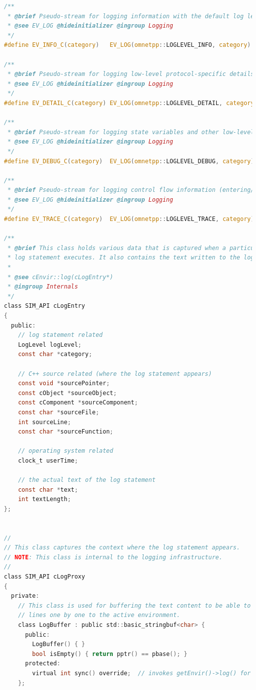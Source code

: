 \begin{lstlisting}[language=c]
/**
 * @brief Pseudo-stream for logging information with the default log level of a specific category. See EV_LOG for details.
 * @see EV_LOG @hideinitializer @ingroup Logging
 */
#define EV_INFO_C(category)   EV_LOG(omnetpp::LOGLEVEL_INFO, category)

/**
 * @brief Pseudo-stream for logging low-level protocol-specific details of a specific category. See EV_LOG for details.
 * @see EV_LOG @hideinitializer @ingroup Logging
 */
#define EV_DETAIL_C(category) EV_LOG(omnetpp::LOGLEVEL_DETAIL, category)

/**
 * @brief Pseudo-stream for logging state variables and other low-level information of a specific category. See EV_LOG for details.
 * @see EV_LOG @hideinitializer @ingroup Logging
 */
#define EV_DEBUG_C(category)  EV_LOG(omnetpp::LOGLEVEL_DEBUG, category)

/**
 * @brief Pseudo-stream for logging control flow information (entering/exiting functions, etc) of a specific category. See EV_LOG for details.
 * @see EV_LOG @hideinitializer @ingroup Logging
 */
#define EV_TRACE_C(category)  EV_LOG(omnetpp::LOGLEVEL_TRACE, category)

/**
 * @brief This class holds various data that is captured when a particular
 * log statement executes. It also contains the text written to the log stream.
 *
 * @see cEnvir::log(cLogEntry*)
 * @ingroup Internals
 */
class SIM_API cLogEntry
{
  public:
    // log statement related
    LogLevel logLevel;
    const char *category;

    // C++ source related (where the log statement appears)
    const void *sourcePointer;
    const cObject *sourceObject;
    const cComponent *sourceComponent;
    const char *sourceFile;
    int sourceLine;
    const char *sourceFunction;

    // operating system related
    clock_t userTime;

    // the actual text of the log statement
    const char *text;
    int textLength;
};


//
// This class captures the context where the log statement appears.
// NOTE: This class is internal to the logging infrastructure.
//
class SIM_API cLogProxy
{
  private:
    // This class is used for buffering the text content to be able to send whole
    // lines one by one to the active environment.
    class LogBuffer : public std::basic_stringbuf<char> {
      public:
        LogBuffer() { }
        bool isEmpty() { return pptr() == pbase(); }
      protected:
        virtual int sync() override;  // invokes getEnvir()->log() for each log line
    };


\end{lstlisting}
